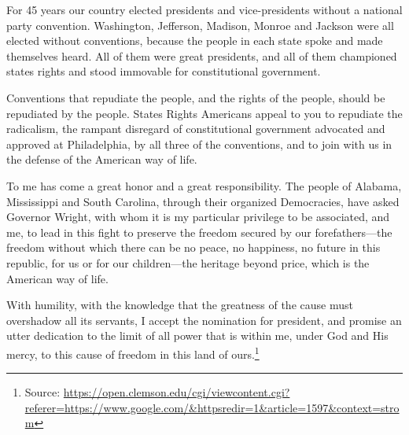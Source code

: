 \documentclass[10pt,a4paper]{article}
\newcommand{\source}[1]{\footnote{Source: \href{#1}{#1}}}
\begin{document}
For 45 years our country elected presidents and vice-presidents without a national party convention. Washington, Jefferson, Madison, Monroe and Jackson were all elected without conventions, because the people in each state spoke and made themselves heard. All of them were great presidents, and all of them championed states rights and stood immovable for constitutional government.

Conventions that repudiate the people, and the rights of the people, should be repudiated by the people. States Rights Americans appeal to you to repudiate the radicalism, the rampant disregard of constitutional government advocated and approved at Philadelphia, by all three of the conventions, and to join with us in the defense of the American way of life.

To me has come a great honor and a great responsibility. The people of Alabama, Mississippi and South Carolina, through their organized Democracies, have asked Governor Wright, with whom it is my particular privilege to be associated, and me, to lead in this fight to preserve the freedom secured by our forefathers—the freedom without which there can be no peace, no happiness, no future in this republic, for us or for our children—the heritage beyond price, which is the American way of life.

With humility, with the knowledge that the greatness of the cause must overshadow all its servants, I accept the nomination for president, and promise an utter dedication to the limit of all power that is within me, under God and His mercy, to this cause of freedom in this land of ours.\source{https://open.clemson.edu/cgi/viewcontent.cgi?referer=https://www.google.com/\&httpsredir=1\&article=1597\&context=strom}
\end{document}
